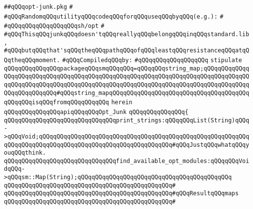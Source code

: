 \label{src/lib/make-library-glue/opt-junk.pkg}
\verb|##qQQqopt-junk.pkg|\newline
\verb|#|\newline
\verb|#qQQqRandomqQQqutilityqQQqcodeqQQqforqQQquseqQQqbyqQQq(e.g.):|\newline
\verb|#|\newline
\verb|#qQQqqQQqqQQqqQQqqQQqsh/opt|\newline
\verb|#|\newline
\verb|#qQQqThisqQQqjunkqQQqdoesn'tqQQqreallyqQQqbelongqQQqinqQQqstandard.lib,|\newline
\verb|#qQQqbutqQQqthat'sqQQqtheqQQqpathqQQqofqQQqleastqQQqresistanceqQQqatqQQqtheqQQqmoment.|\newline
\newline
\verb|#qQQqCompiledqQQqby:|\newline
\verb|#qQQqqQQqqQQqqQQqqQQq|\newline
\newline
\verb|stipulate|\newline
\verb|qQQqqQQqqQQqqQQqpackageqQQqsmqQQqqQQq=qQQqqQQqstring_map;qQQqqQQqqQQqqQQqqQQqqQQqqQQqqQQqqQQqqQQqqQQqqQQqqQQqqQQqqQQqqQQqqQQqqQQqqQQqqQQqqQQqqQQqqQQqqQQqqQQqqQQqqQQqqQQqqQQqqQQqqQQqqQQqqQQqqQQqqQQqqQQqqQQqqQQqqQQqqQQqqQQqqQQq#qQQqstring_mapqQQqqQQqqQQqqQQqqQQqqQQqqQQqqQQqqQQqqQQqqQQqqQQqisqQQqfromqQQqqQQqqQQq|\newline
\verb|herein|\newline
\verb|qQQqqQQqqQQqqQQqapiqQQqqQQqOpt_Junk|\newline
\verb|qQQqqQQqqQQqqQQq{|\newline
\verb|qQQqqQQqqQQqqQQqqQQqqQQqqQQqqQQqprint_strings:qQQqqQQqList(String)qQQq->qQQqVoid;qQQqqQQqqQQqqQQqqQQqqQQqqQQqqQQqqQQqqQQqqQQqqQQqqQQqqQQqqQQqqQQqqQQqqQQqqQQqqQQqqQQqqQQqqQQqqQQqqQQqqQQqqQQq#qQQqJustqQQqwhatqQQqyouqQQqthink.|\newline
\newline
\verb|qQQqqQQqqQQqqQQqqQQqqQQqqQQqqQQqfind_available_opt_modules:qQQqqQQqVoidqQQq->qQQqsm::Map(String);qQQqqQQqqQQqqQQqqQQqqQQqqQQqqQQqqQQqqQQqqQQq|\newline
\verb|qQQqqQQqqQQqqQQqqQQqqQQqqQQqqQQqqQQqqQQqqQQqqQQq#|\newline
\verb|qQQqqQQqqQQqqQQqqQQqqQQqqQQqqQQqqQQqqQQqqQQqqQQq#qQQqResultqQQqmaps|\newline
\verb|qQQqqQQqqQQqqQQqqQQqqQQqqQQqqQQqqQQqqQQqqQQqqQQq#|\newline
